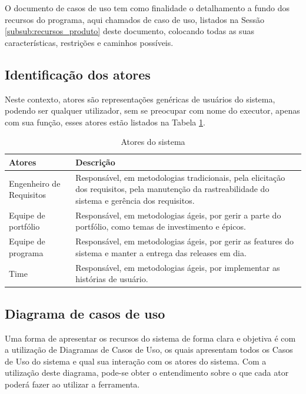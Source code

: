 
O documento de casos de uso tem como finalidade o detalhamento a fundo dos recursos do programa, aqui chamados de caso de uso, listados na Sessão \ref{subsub:recursos_produto} deste documento, colocando todas as suas características, restrições e caminhos possíveis.

\subsection{Identificação dos atores}

Neste contexto, atores são representações genéricas de usuários do sistema, podendo ser qualquer utilizador, sem se preocupar com nome do executor, apenas com sua função, esses atores estão listados na Tabela \ref{tab:atores}.

\begin{table}[H]
\centering
\begin{tabular}{|l|p{8cm}|}

\hline
\textbf{Atores} &
\textbf{Descrição}
\\ \hline
Engenheiro de Requisitos &
Responsável, em metodologias tradicionais, pela elicitação dos requisitos, pela manutenção da rastreabilidade do sistema e gerência dos requisitos.
\\ \hline
Equipe de portfólio &
Responsável, em metodologias ágeis, por gerir a parte do portfólio, como temas de investimento e épicos.
\\ \hline
Equipe de programa &
Responsável, em metodologias ágeis, por gerir as features do sistema e manter a entrega das releases em dia.
\\ \hline
Time &
Responsável, em metodologias ágeis, por implementar as histórias de usuário.
\\ \hline

\end{tabular}
\caption{Atores do sistema}
\label{tab:atores}
\end{table}

\subsection{Diagrama de casos de uso}

Uma forma de apresentar os recursos do sistema de forma clara e objetiva é com a utilização de Diagramas de Casos de Uso, os quais apresentam todos os Casos de Uso do sistema e qual sua interação com os atores do sistema. Com a utilização deste diagrama, pode-se obter o entendimento sobre o que cada ator poderá fazer ao utilizar a ferramenta.

